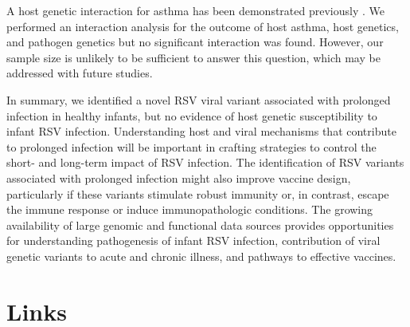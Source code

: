 \documentclass{article} %
\begin{document}
A host genetic interaction for asthma has been demonstrated previously 
\citep{moffatt2010large}.
We performed an interaction analysis for the outcome of host asthma, host genetics, and pathogen genetics 
but no significant interaction was found. 
However, our sample size is unlikely to be sufficient to answer this question, 
which may be addressed with future studies. 

In summary, we identified a novel RSV viral variant associated with prolonged infection in healthy infants, but no evidence of host genetic susceptibility to infant RSV infection. Understanding host and viral mechanisms that contribute to prolonged infection will be important in crafting strategies to control the short- and long-term impact of RSV infection. The identification of RSV variants associated with prolonged infection might also improve vaccine design, particularly if these variants stimulate robust immunity or, in contrast, escape the immune response or induce immunopathologic conditions. The growing availability of large genomic and functional data sources provides opportunities for understanding pathogenesis of infant RSV infection, contribution of viral genetic variants to acute and chronic illness, and pathways to effective vaccines.



\section{Links}
\end{document}
